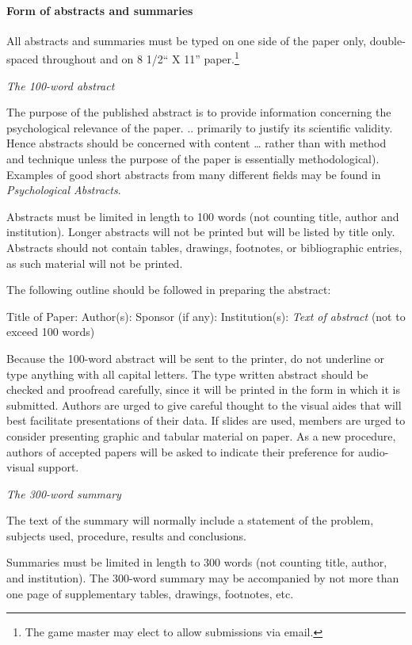 {{\paragraph{Form of abstracts and summaries}
\label{formofabstractsandsummaries}

All abstracts and summaries must be typed on one side of the paper only, double-spaced throughout and on 8 1\slash 2`` X 11'' paper.\footnote{The game master may elect to allow submissions via email.}

\emph{The 100-word abstract}

The purpose of the published abstract is to provide information concerning the psychological relevance of the paper. .. primarily to justify its scientific validity. Hence abstracts should be concerned with content {\ldots} rather than with method and technique unless the purpose of the paper is essentially methodological). Examples of good short abstracts from many different fields may be found in \emph{Psychological Abstracts}.

Abstracts must be limited in length to 100 words (not counting title, author and institution). Longer abstracts will not be printed but will be listed by title only. Abstracts should not contain tables, drawings, footnotes, or bibliographic entries, as such material will not be printed.

The following outline should be followed in preparing the abstract:

Title of Paper:
Author(s): Sponsor (if any):
Institution(s):
 \emph{Text of abstract} (not to exceed 100 words)

Because the 100-word abstract will be sent to the printer, do not underline or type anything with all capital letters. The type written abstract should be checked and proofread carefully, since it will be printed in the form in which it is submitted. Authors are urged to give careful thought to the visual aides that will best facilitate presentations of their data. If slides are used, members are urged to consider presenting graphic and tabular material on paper. As a new procedure, authors of accepted papers will be asked to indicate their preference for audio-visual support.

\emph{The 300-word summary}

The text of the summary will normally include a statement of the problem, subjects used, procedure, results and conclusions.

Summaries must be limited in length to 300 words (not counting title, author, and institution). The 300-word summary may be accompanied by not more than one page of supplementary tables, drawings, footnotes, etc.

}}
